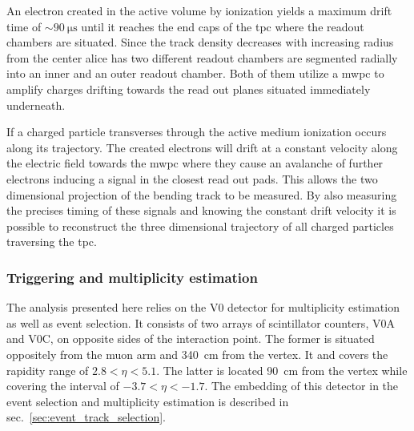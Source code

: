 An electron created in the active volume by ionization yields a maximum drift time of $\sim \SI{90}{\micro \second}$ until it reaches the end caps of the \gls{tpc} where the readout chambers are situated. Since the track density decreases with increasing radius from the center \gls{alice} has two different readout chambers are segmented radially into an inner and an outer readout chamber. Both of them utilize a \gls{mwpc} to amplify charges drifting towards the read out planes situated immediately underneath.

If a charged particle transverses through the active medium ionization occurs along its trajectory. The created electrons will drift at a constant velocity along the electric field towards the \gls{mwpc} where they cause an avalanche of further electrons inducing a signal in the closest read out pads. This allows the two dimensional projection of the bending track to be measured. By also measuring the precises timing of these signals and knowing the constant drift velocity it is possible to reconstruct the three dimensional trajectory of all charged  particles traversing the \gls{tpc}.


\subsubsection{Triggering and multiplicity estimation}
The analysis presented here relies on the V0 detector for multiplicity estimation as well as event selection. It consists of two arrays of scintillator counters, V0A and V0C, on opposite sides of the interaction point. The former is situated oppositely from the muon arm and \SI{340}{cm} from the vertex. It and covers the rapidity range of $2.8 < \eta < 5.1$. The latter is located \SI{90}{cm} from the vertex while covering the interval of $-3.7 < \eta < -1.7$. The embedding of this detector in the event selection and multiplicity estimation is described in sec.~\ref{sec:event_track_selection}.

